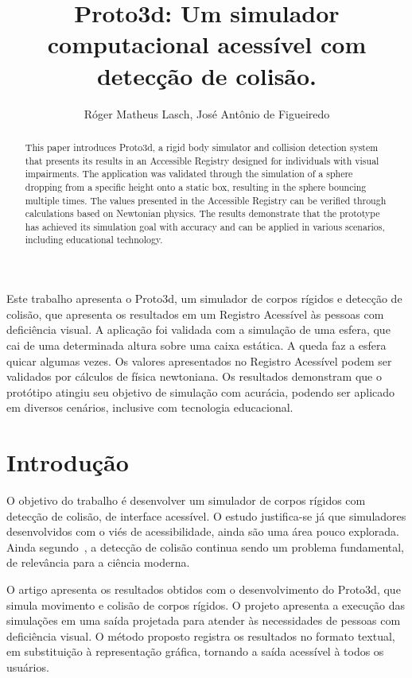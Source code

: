 \documentclass[12pt]{article}
\title{Proto3d: Um simulador computacional acessível com detecção de colisão.}
\author{Róger Matheus Lasch\inst{1}, José Antônio de Figueiredo\inst{1}}
\begin{document}
 

\maketitle

\begin{abstract}
This paper introduces Proto3d, a rigid body simulator and collision detection system that presents its results in an Accessible Registry designed for individuals with visual impairments. The application was validated through the simulation of a sphere dropping from a specific height onto a static box, resulting in the sphere bouncing multiple times. The values presented in the Accessible Registry can be verified through calculations based on Newtonian physics. The results demonstrate that the prototype has achieved its simulation goal with accuracy and can be applied in various scenarios, including educational technology.
\end{abstract}
     
\begin{resumo} 
Este trabalho apresenta o Proto3d, um simulador de corpos rígidos e detecção de colisão, que apresenta os resultados em um Registro Acessível às pessoas com deficiência visual. A aplicação foi validada com a simulação de uma esfera, que cai de uma determinada altura sobre uma caixa estática. A queda faz a esfera quicar algumas vezes. Os valores apresentados no Registro Acessível podem ser validados por cálculos de física newtoniana. Os resultados demonstram que o protótipo atingiu seu objetivo de simulação com acurácia, podendo ser aplicado em diversos cenários, inclusive com tecnologia educacional.
\end{resumo}

\section{Introdução}
O objetivo do trabalho é desenvolver um simulador de corpos rígidos com detecção de colisão, de interface acessível. O estudo justifica-se já que simuladores desenvolvidos com o viés de acessibilidade, ainda são uma área pouco explorada. Ainda segundo~\cite{ericson2004real}, a detecção de colisão continua sendo um problema fundamental, de relevância para a ciência moderna.

O artigo apresenta os resultados obtidos com o desenvolvimento do Proto3d, que simula movimento e colisão de corpos rígidos. O projeto apresenta a execução das simulações em uma saída projetada para atender às necessidades de pessoas com deficiência visual. O método proposto registra os resultados no formato textual, em substituição à representação gráfica, tornando a saída acessível à todos os usuários.
\end{document}
